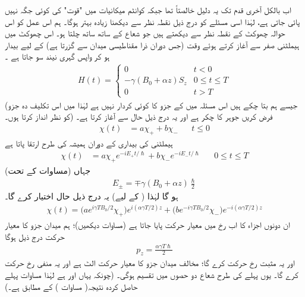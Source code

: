  اب بالکل آخری قدم تک یہ دلیل خالصتاً    تھا جبکہ کوانٹم میکانیات میں "قوت" کی کوئی جگہ نہیں پائی جاتی ہے، لہٰذا اسی مسئلے کو درج ذیل نقطہ نظر سے دیکھنا زیادہ بہتر ہوگا۔  ہم اس عمل کو اس حوالہ چھوکٹ کے نقطہ نظر سے دیکھتے ہیں جو شعاع کے ساتھ ساتھ چلتا ہو۔ اس چھوکٹ میں ہیملٹنی صفر سے آغاز  کرتے ہوئے وقت  (جس دوران ذرا مقناطیسی میدان سے گزرتا ہے)  کے لیے بیدار ہو کر واپس گہری نیند سو جاتا ہے ۔
\begin{align}
H (t) = 
\begin{cases}
0 & t < 0 \\
- \gamma (B_0 + \alpha z) S_z & 0 \le t \le T \\
0 & t > T
\end{cases}
\end{align}
(جیسے ہم بتا چکے ہیں اس مسئلہ میں  کے  جزو کا کوئی کردار نہیں ہے لہٰذا میں اس تکلیف دہ جزو کو نظر انداز کرتا ہوں۔) فرض کریں جوہر کا چکر  ہے اور یہ درج ذیل حال سے آغاز  کرتا ہے۔ 
\begin{align*}
\chi (t) &= a \chi_{+} + b\chi_{-} && t\le 0
\end{align*}
ہیملٹنی کی بیداری کے دوران   ہمیشہ کی طرح ارتقا پاتا ہے 
\begin{align*}
\chi (t) &= a \chi_{+} e^{- i E_{+} t/\hslash} + b \chi_{-} e^{- i E_{-} t/\hslash} && 0 \le  t \le T
\end{align*}
جہاں (مساوات   کے تحت) 
\begin{align}
E_{\pm} = \mp \gamma (B_0 + \alpha z) \frac{\hslash}{2}
\end{align} 
 ہو گا لہٰذا (  کے لیے)  یہ درج ذیل حال اختیار کرے گا۔ 
\begin{align}
\chi (t) = \big ( a e^{i \gamma T B_0 /2} \chi_{+} \big ) e^{i (\alpha \gamma T/2) z} + \big ( b e^{- i \gamma T B_0 /2} \chi_{-} \big ) e^{- i (\alpha \gamma T/2) z}
\end{align}
ان دونوں اجزاء کا اب  رخ میں   معیار حرکت پایا جاتا ہے (مساوات  دیکھیں)؛   ہم  میدان جزو کا معیار حرکت درج ذیل ہوگا 
\begin{align}\label{مساوات_تین_ابعادی_کوانٹائی_زیڈ_معیار_حرکت}
p_z = \frac{\alpha \gamma T \hslash}{2}
\end{align}
اور یہ مثبت  رخ  حرکت  کرے گا؛  مخالف میدان جزو کا معیار حرکت الٹ ہے اور یہ منفی  رخ  حرکت کرے گا۔ یوں پہلے کی طرح شعاع دو حصوں میں تقسیم ہوگی۔  (چونکہ 
یہاں  اور   ہے لہٰذا مساوات   پہلے حاصل کردہ  نتیجہ( مساوات  )   کے مطابق ہے۔)


